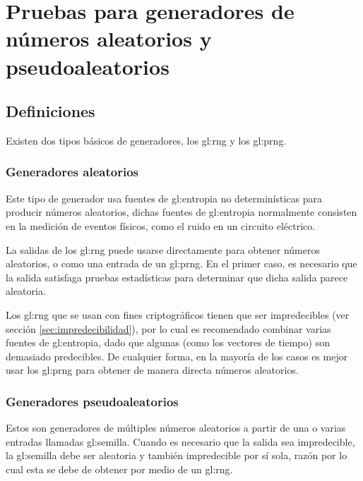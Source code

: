 %
%

\section{Pruebas para generadores de números aleatorios y pseudoaleatorios}
\label{sec:pruebas_para_generadores}


\subsection{Definiciones} %

Existen dos tipos básicos de generadores, los \gls{gl:rng} y los \gls{gl:prng}.

\subsubsection{Generadores aleatorios} %

Este tipo de generador usa fuentes de \gls{gl:entropia} no determinísticas
para producir números aleatorios, dichas fuentes de \gls{gl:entropia}
normalmente consisten en la medición de eventos físicos, como el ruido
en un circuito eléctrico.

La salidas de los \gls{gl:rng} puede usarse directamente para obtener números
aleatorios, o como una entrada de un \gls{gl:prng}. En el primer caso, es
necesario que la salida satisfaga pruebas estadísticas para determinar que
dicha salida parece aleatoria.

Los \gls{gl:rng} que se usan con fines criptográficos tienen que ser
impredecibles (ver sección \ref{sec:impredecibilidad}), por lo cual es
recomendado combinar varias fuentes de \gls{gl:entropia}, dado que algunas
(como los vectores de tiempo) son demasiado predecibles. De cualquier forma,
en la mayoría de los casos es mejor usar los \gls{gl:prng} para obtener de
manera directa números aleatorios.

\subsubsection{Generadores pseudoaleatorios} %

Estos son generadores de múltiples números aleatorios a partir de una o varias
entradas llamadas \gls{gl:semilla}. Cuando es necesario que la salida sea
impredecible, la \gls{gl:semilla} debe ser aleatoria y también impredecible
por sí sola, razón por lo cual esta se debe de obtener por medio de un
\gls{gl:rng}.


